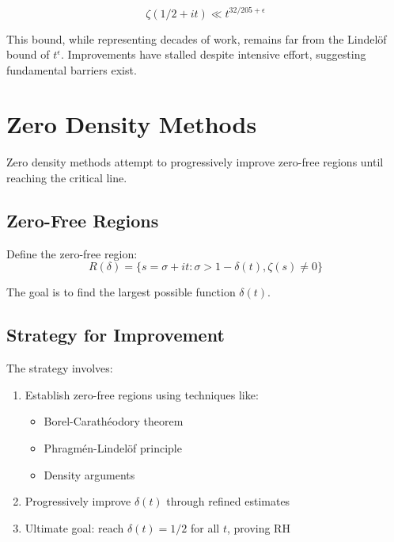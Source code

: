 \begin{theorem}
\begin{equation}
\zeta(1/2 + it) \ll t^{32/205 + \epsilon}
\end{equation}
\end{theorem}

\begin{remark}
This bound, while representing decades of work, remains far from the Lindelöf bound of $t^{\epsilon}$. Improvements have stalled despite intensive effort, suggesting fundamental barriers exist.
\end{remark}

\section{Zero Density Methods}

Zero density methods attempt to progressively improve zero-free regions until reaching the critical line.

\subsection{Zero-Free Regions}

Define the zero-free region:
\begin{equation}
R(\delta) = \{s = \sigma + it : \sigma > 1 - \delta(t), \zeta(s) \neq 0\}
\end{equation}

The goal is to find the largest possible function $\delta(t)$.

\subsection{Strategy for Improvement}

The strategy involves:
\begin{enumerate}
\item Establish zero-free regions using techniques like:
   \begin{itemize}
   \item Borel-Carathéodory theorem
   \item Phragmén-Lindelöf principle  
   \item Density arguments
   \end{itemize}
\item Progressively improve $\delta(t)$ through refined estimates
\item Ultimate goal: reach $\delta(t) = 1/2$ for all $t$, proving RH
\end{enumerate}


